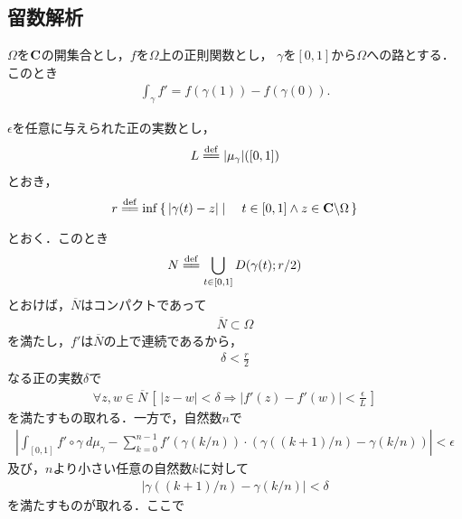 \subsection{留数解析}
	\begin{screen}
		\begin{thm}[線積分の微分積分学の基本定理]
			$\Omega$を$\mathbf{C}$の開集合とし，$f$を$\Omega$上の正則関数とし，
			$\gamma$を$[0,1]$から$\Omega$への路とする．このとき
			\begin{align}
				\int_{\gamma} f' = f(\gamma(1)) - f(\gamma(0)).
			\end{align}
		\end{thm}
	\end{screen}
	
	\begin{sketch}
		$\epsilon$を任意に与えられた正の実数とし，
		\begin{align}
			L \defeq |\mu_{\gamma}|([0,1])
		\end{align}
		とおき，
		\begin{align}
			r \defeq \inf{}{\Set{|\gamma(t) - z|}{t \in [0,1] \wedge z \in \C \backslash \Omega}}
		\end{align}
		とおく．このとき
		\begin{align}
			N \defeq \bigcup_{t \in [0,1]} \disc{\gamma(t)}{r/2}
		\end{align}
		とおけば，$\overline{N}$はコンパクトであって
		\begin{align}
			\overline{N} \subset \Omega
		\end{align}
		を満たし，$f'$は$\overline{N}$の上で連続であるから，
		\begin{align}
			\delta < \frac{r}{2}
		\end{align}
		なる正の実数$\delta$で
		\begin{align}
			\forall z,w \in \overline{N}\,
			\left[\, |z-w| < \delta \Longrightarrow |f'(z) - f'(w)| < \frac{\epsilon}{L}\, \right]
		\end{align}
		を満たすもの取れる．一方で，自然数$n$で
		\begin{align}
			\left|\int_{[0,1]} f' \circ \gamma\ d\mu_{\gamma}
			- \sum_{k=0}^{n-1} f'(\gamma(k/n)) \cdot \left(\gamma((k+1)/n) - \gamma(k/n)\right)\right|
			< \epsilon
		\end{align}
		及び，$n$より小さい任意の自然数$k$に対して
		\begin{align}
			|\gamma((k+1)/n) - \gamma(k/n)| < \delta
		\end{align}
		を満たすものが取れる．ここで
		\begin{align}

\end{align}
\end{sketch}
